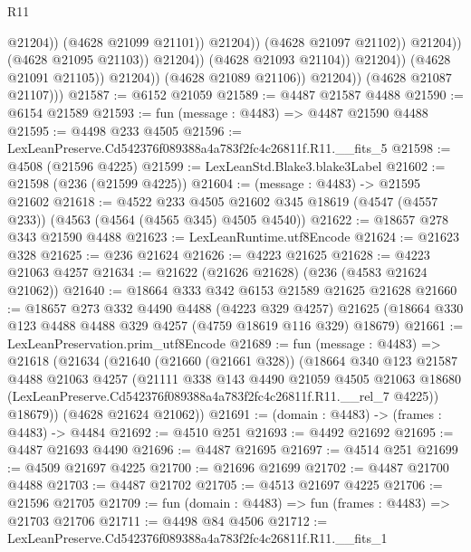 \begin{lexlean}{R11}
\begin{coremodule}
                                                @21204))
                                            (@4628 @21099 @21101))
                                          @21204))
                                      (@4628 @21097 @21102))
                                    @21204))
                                (@4628 @21095 @21103))
                              @21204))
                          (@4628 @21093 @21104))
                        @21204))
                    (@4628 @21091 @21105))
                  @21204))
              (@4628 @21089 @21106))
            @21204))
        (@4628 @21087 @21107)))
@21587 := @6152 @21059
@21589 := @4487 @21587 @4488
@21590 := @6154 @21589
@21593 := fun (message : @4483) => @4487 @21590 @4488
@21595 := @4498 @233 @4505
@21596 := LexLeanPreserve.Cd542376f089388a4a783f2fc4c26811f.R11.__fits_5
@21598 := @4508 (@21596 @4225)
@21599 := LexLeanStd.Blake3.blake3Label
@21602 := @21598 (@236 (@21599 @4225))
@21604 := (message : @4483) -> @21595 @21602
@21618 := @4522
    @233
    @4505
    @21602
    @345
    @18619
    (@4547 (@4557 @233))
    (@4563 (@4564 (@4565 @345) @4505 @4540))
@21622 := @18657 @278 @343 @21590 @4488
@21623 := LexLeanRuntime.utf8Encode
@21624 := @21623 @328
@21625 := @236 @21624
@21626 := @4223 @21625
@21628 := @4223 @21063 @4257
@21634 := @21622 (@21626 @21628) (@236 (@4583 @21624 @21062))
@21640 := @18664 @333 @342 @6153 @21589 @21625 @21628
@21660 := @18657
    @273
    @332
    @4490
    @4488
    (@4223 @329 @4257)
    @21625
    (@18664 @330 @123 @4488 @4488 @329 @4257 (@4759 @18619 @116 @329) @18679)
@21661 := LexLeanPreservation.prim_utf8Encode
@21689 := fun (message : @4483) =>
  @21618
    (@21634
      (@21640
        (@21660 (@21661 @328))
        (@18664
          @340
          @123
          @21587
          @4488
          @21063
          @4257
          (@21111
            @338
            @143
            @4490
            @21059
            @4505
            @21063
            @18680
            (LexLeanPreserve.Cd542376f089388a4a783f2fc4c26811f.R11.__rel_7 @4225))
          @18679))
      (@4628 @21624 @21062))
@21691 := (domain : @4483) -> (frames : @4483) -> @4484
@21692 := @4510 @251
@21693 := @4492 @21692
@21695 := @4487 @21693 @4490
@21696 := @4487 @21695
@21697 := @4514 @251
@21699 := @4509 @21697 @4225
@21700 := @21696 @21699
@21702 := @4487 @21700 @4488
@21703 := @4487 @21702
@21705 := @4513 @21697 @4225
@21706 := @21596 @21705
@21709 := fun (domain : @4483) => fun (frames : @4483) => @21703 @21706
@21711 := @4498 @84 @4506
@21712 := LexLeanPreserve.Cd542376f089388a4a783f2fc4c26811f.R11.__fits_1

\end{coremodule}
\end{lexlean}
